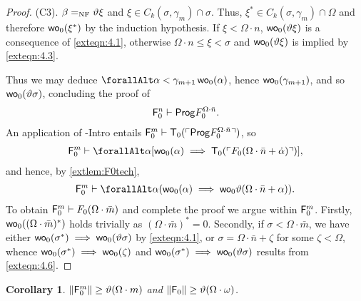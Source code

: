 \documentclass[UKenglish,cleveref,DIV=12]{scrartcl}
\let\forall\forallAlt
\newtheorem{corollary}[lemma]{Corollary}
\theoremstyle{definition}
\theoremstyle{definition}
\begin{document}
\begin{proof}
(C3). $\beta=_{\mathrm{NF}}\vartheta\xi$ and $\xi\in C_k(\sigma,\gamma_m)\cap\sigma$. Thus,
$\xi^*\in C_k(\sigma,\gamma_m)\cap\Omega$ and therefore $\mathsf{wo}_0(\xi^*)$ by the
induction hypothesis. If $\xi<\Omega\cdot n$, $\mathsf{wo}_0(\vartheta\xi)$ is a
consequence of \cref{exteqn:4.1}, otherwise $\Omega\cdot n\le\xi<\sigma$ and
$\mathsf{wo}_0(\vartheta\xi)$ is implied by \cref{exteqn:4.3}.

Thus we may deduce $\forall\alpha<\gamma_{m+1}\,\wo_0(\alpha)$, hence
$\mathsf{wo}_0(\gamma_{m+1})$, and so $\mathsf{wo}_0(\vartheta\sigma)$, concluding the proof of
\begin{align}\label{exteqn:4.2}
  \mathsf{F}_0^n\vdash\mathsf{Prog} F^{\Omega\cdot\bar n}_0.
\end{align}
An application of -Intro entails $\mathsf{F}_0^m\vdash \mathsf{T}_0(\ulcorner{\mathsf{Prog}F^{\Omega\cdot\bar n}_0}\urcorner)$, so
\begin{align*}
  \F_0^m\proves\forall\alpha[\wo_0(\alpha)\implies
   \T_0(\gn{F_0(\Omega\cdot\bar n+\dot\alpha)})],
\end{align*}
and hence, by \cref{extlem:F0tech},
\begin{align}\label{exteqn:4.6}
  \F_0^m\proves\forall\alpha(\wo_0(\alpha)\implies\wo_0\vartheta(\Omega\cdot\bar
  n+\alpha)).
\end{align}
To obtain $\mathsf{F}_0^m\vdash F_0(\Omega\cdot\bar m)$ and complete the proof we
argue within $\mathsf{F}_0^m$. Firstly, $\mathsf{wo}_0((\Omega\cdot\bar m)^*)$ holds trivially as $(\Omega\cdot\bar m)^*=0$. Secondly, if
$\sigma<\Omega\cdot\bar m$, we have either $\mathsf{wo}_0(\sigma^*)\implies
\mathsf{wo}_0(\vartheta\sigma)$ by \cref{exteqn:4.1}, or $\sigma=\Omega\cdot\bar
n+\zeta$ for some $\zeta<\Omega$, whence $\mathsf{wo}_0(\sigma^*)\implies \mathsf{wo}_0(\zeta)$
and $\mathsf{wo}_0(\sigma^*)\implies \mathsf{wo}_0(\vartheta\sigma)$ results from
\cref{exteqn:4.6}.
\end{proof}
\begin{corollary}\label{extcor:F0lowerbound}
 $\lVert{\mathsf{F}_0^m}\rVert\ge\vartheta(\Omega\cdot m)$ and $\lVert{\mathsf{F}_0}\rVert\ge\vartheta(\Omega\cdot\omega)$.
\end{corollary}
\end{document}
